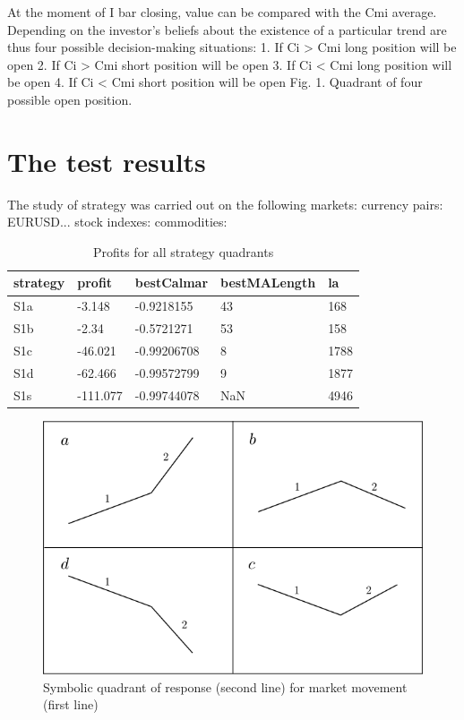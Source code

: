 \documentclass{tewiart}
\begin{document}
At the moment of I bar closing, value can be compared with the Cmi average. Depending on the investor's beliefs about the existence of a particular trend are thus four possible decision-making situations:
1. If Ci  > Cmi  long position will be open
2. If Ci  > Cmi  short position will be open
3. If Ci  < Cmi  long position will be open
4. If Ci  < Cmi  short position will be open
Fig. 1. Quadrant of four possible open position.


\section{The test results}
The study of strategy was carried out on the following markets:
currency pairs: EURUSD...
stock indexes: 
commodities: 

\begin{table}[!t]
\caption{Profits for all strategy quadrants} 
 \begin{center} 
 \begin{tabular}{|l|l|l|l|l|} 
 \hline \textbf{strategy} & \textbf{profit} & \textbf{bestCalmar} & \textbf{bestMALength} & \textbf{la} \\ \hline  
S1a & -3.148 & -0.9218155 & 43 & 168\\ \hline 
S1b & -2.34 & -0.5721271 & 53 & 158\\ \hline 
S1c & -46.021 & -0.99206708 & 8 & 1788\\ \hline 
S1d & -62.466 & -0.99572799 & 9 & 1877\\ \hline 
S1s & -111.077 & -0.99744078 & NaN & 4946\\ 
\hline \end{tabular} 
 \end{center} 
 \end{table}

\begin{figure}[h]
 \centering
 \includegraphics[width=\textwidth]{Rysunek0_all2.png}
 \caption{Symbolic quadrant of response (second line) for market movement (first line)}
\end{figure}
\FloatBarrier
\end{document}

